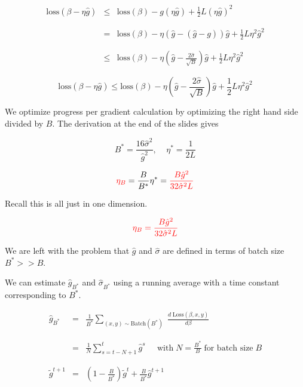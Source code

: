 {

\begin{eqnarray*}
  \mathrm{loss}(\beta - \eta\hat{g}) & \leq & \mathrm{loss}(\beta) - g(\eta\hat{g}) + \frac{1}{2}L(\eta\hat{g})^2 \\
  \\
  \\
  & = &  \mathrm{loss}(\beta) - \eta (\hat{g} - (\hat{g} -g)) \hat{g} + \frac{1}{2}L\eta^2 \hat{g}^2 \\
  \\
  \\
  & \leq &  \mathrm{loss}(\beta) - \eta \left(\hat{g} - \frac{2\hat{\sigma}}{\sqrt{B}}\right)\hat{g} + \frac{1}{2}L \eta^2 \hat{g}^2
\end{eqnarray*}


$$\mathrm{loss}(\beta - \eta\hat{g}) \leq \mathrm{loss}(\beta) - \eta \left(\hat{g} - \frac{2\hat{\sigma}}{\sqrt{B}} \right)\hat{g}  + \frac{1}{2}L \eta^2 \hat{g}^2$$

\vfill
We optimize progress per gradient calculation by optimizing the right hand side divided by $B$.  The derivation at the end of the slides gives

\vfill
$$B^*  =  \frac{16\hat{\sigma}^2}{\hat{g}^2},\;\;\;\;\eta^*  =  \frac{1}{2L}$$

\vfill
$${\color{red} \eta_B} = \frac{B}{B^*} \eta^* = {\color{red} \frac{B \hat{g}^2}{32\hat{\sigma}^2L}}$$

\vfill
Recall this is all just in one dimension.


$${\color{red} \eta_B = \frac{B \hat{g}^2}{32\hat{\sigma}^2L}}$$

\vfill
We are left with the problem that $\hat{g}$ and $\hat{\sigma}$ are defined in terms of batch size $B^* >> B$.

\vfill
We can estimate $\hat{g}_{B^*}$ and $\hat{\sigma}_{B^*}$ using a running average with a time constant corresponding to $B^*$.


\begin{eqnarray*}
  \hat{g}_{B^*} & = & \frac{1}{B^*} \sum_{(x,y) \sim \mathrm{Batch}(B^*)}\; \frac{d\;\mathrm{Loss}(\beta,x,y)}{d\beta} \\
  \\
  \\
  & = & \frac{1}{N} \sum_{s=t-N+1}^t \hat{g}^s\;\;\;\;\;\mbox{with}\;N= \frac{B^*}{B} \;\mbox{for batch size}\;B \\
  \\
  \\
  \tilde{g}^{t+1} & = & \left(1-\frac{B}{B^*}\right)\tilde{g}^t + \frac{B}{B^*} \hat{g}^{t+1}
\end{eqnarray*}

}
